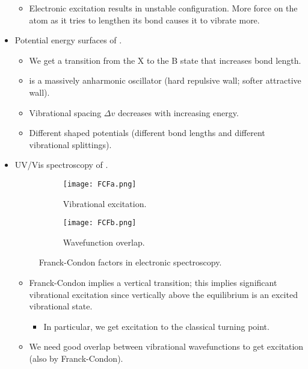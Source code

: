 \documentclass[../notes.tex]{subfiles}
\begin{document}
\begin{itemize}
\begin{itemize}
        \item Electronic excitation results in unstable configuration. More force on the atom as it tries to lengthen its bond causes it to vibrate more.
    \end{itemize}
    \item Potential energy surfaces of .
    \begin{itemize}
        \item We get a transition from the X to the B state that increases bond length.
        \item {} is a massively anharmonic oscillator (hard repulsive wall; softer attractive wall).
        \item Vibrational spacing $\Delta v$ decreases with increasing energy.
        \item Different shaped potentials (different bond lengths and different vibrational splittings).
    \end{itemize}
    \item UV/Vis spectroscopy of .
    \begin{figure}[h!]
        \centering
        \begin{subfigure}[b]{0.49\linewidth}
            \centering
            \texttt{[image: FCFa.png]}
            \caption{Vibrational excitation.}
            \label{fig:FCFa}
        \end{subfigure}
        \begin{subfigure}[b]{0.49\linewidth}
            \centering
            \texttt{[image: FCFb.png]}
            \caption{Wavefunction overlap.}
            \label{fig:FCFb}
        \end{subfigure}
        \caption{Franck-Condon factors in electronic spectroscopy.}
        \label{fig:FCF}
    \end{figure}
    \begin{itemize}
        \item Franck-Condon implies a vertical transition; this implies significant vibrational excitation since vertically above the equilibrium is an excited vibrational state.
        \begin{itemize}
            \item In particular, we get excitation to the classical turning point.
        \end{itemize}
        \item We need good overlap between vibrational wavefunctions to get excitation (also by Franck-Condon).

\end{itemize}
\end{itemize}
\end{document}
